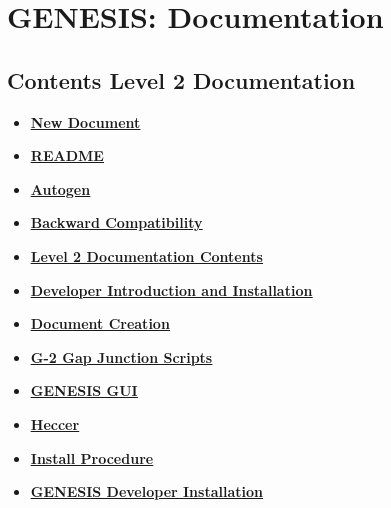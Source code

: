 \documentclass[12pt]{article}
\begin{document}
\section*{GENESIS: Documentation}

\subsection*{Contents Level 2 Documentation}

\begin{itemize}

\item \href{../NewDocument/NewDocument.pdf}{\bf \underline{New Document}}

\item \href{../README/README.pdf}{\bf \underline{README}}

\item \href{../autogen/autogen.pdf}{\bf \underline{Autogen}}

\item \href{../backward-compatibility/backward-compatibility.pdf}{\bf \underline{Backward Compatibility}}

\item \href{../contents-level2/contents-level2.pdf}{\bf \underline{Level 2 Documentation Contents}}

\item \href{../developers-intro/developers-intro.pdf}{\bf \underline{Developer Introduction and Installation}}

\item \href{../document-create/document-create.pdf}{\bf \underline{Document Creation}}

\item \href{../g2-gap-junction/g2-gap-junction.pdf}{\bf \underline{G-2 Gap Junction Scripts}}

\item \href{../gui/gui.pdf}{\bf \underline{GENESIS GUI}}

\item \href{../heccer/heccer.pdf}{\bf \underline{Heccer}}

\item \href{../install-procedure/install-procedure.pdf}{\bf \underline{Install Procedure}}

\item \href{../installation-developer/installation-developer.pdf}{\bf \underline{GENESIS Developer Installation}}


\end{itemize}
\end{document}
